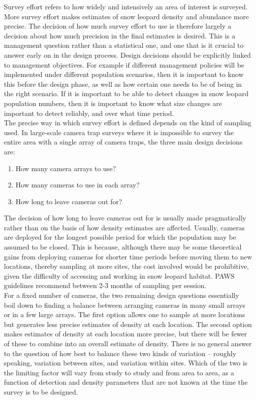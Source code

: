\documentclass[a4paper,11pt]{article} %
\begin{document}
Survey effort refers to how widely and intensively an area of interest is surveyed. More survey effort makes estimates of snow leopard density and abundance more precise. The decision of how much survey effort to use is therefore largely a decision about how much precision in the final estimates is desired. This is a management question rather than a statistical one, and one that is it crucial to answer early on in the design process. Design decisions should be explicitly linked to management objectives. For example if different management policies will be implemented under different population scenarios, then it is important to know this before the design phase, as well as how certain one needs to be of being in the right scenario. If it is important to be able to detect changes in snow leopard population numbers, then it is important to know what size changes are important to detect reliably, and over what time period. 
\\[1em]
The precise way in which survey effort is defined depends on the kind of sampling used. In large-scale camera trap surveys where it is impossible to survey the entire area with a single array of camera traps, the three main design decisions are:
\begin{enumerate}
\item How many camera arrays to use? 
\item How many cameras to use in each array?
\item How long to leave cameras out for?
\end{enumerate}
The decision of how long to leave cameras out for is usually made pragmatically rather than on the basis of how density estimates are affected. Usually, cameras are deployed for the longest possible period for which the population may be assumed to be closed. This is because, although there may be some theoretical gains from deploying cameras for shorter time periods before moving them to new locations, thereby sampling at more sites, the cost involved would be prohibitive, given the difficulty of accessing and working in snow leopard habitat. PAWS guidelines recommend between 2-3 months of sampling per session. 
\\[1em]
For a fixed number of cameras, the two remaining design questions essentially boil down to finding a balance between arranging cameras in many small arrays or in a few large arrays. The first option allows one to sample at more locations but generates less precise estimates of density at each location. The second option makes estimates of density at each location more precise, but there will be fewer of these to combine into an overall estimate of density. There is no general answer to the question of how best to balance these two kinds of variation -- roughly speaking, variation between sites, and variation within sites. Which of the two is the limiting factor will vary from study to study and from area to area, as a function of detection and density parameters that are not known at the time the survey is to be designed.
\end{document}
